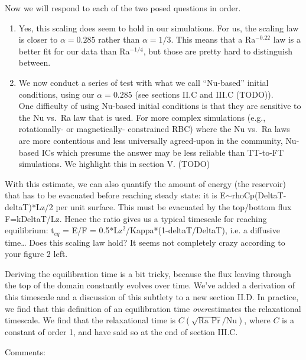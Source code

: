 \documentclass[aps, 11pt, singlecolumn]{revtex4-1} %
\begin{document}
\begin{singlespace}
Now we will respond to each of the two posed questions in order.
\begin{enumerate}
\item 
Yes, this scaling does seem to hold in our simulations.
For us, the scaling law is closer to $\alpha = 0.285$ rather than $\alpha = 1/3$.
This means that a Ra$^{-0.22}$ law is a better fit for our data than Ra$^{-1/4}$, but those are pretty hard to distinguish between.
\item 
We now conduct a series of test with what we call ``Nu-based'' initial conditions, using our $\alpha = 0.285$ (see sections II.C and III.C (TODO)).
\vspace{0.5cm}
\\
One difficulty of using Nu-based initial conditions is that they are sensitive to the Nu vs.~Ra law that is used.
For more complex simulations (e.g., rotationally- or magnetically- constrained RBC) where the Nu vs.~Ra laws are more contentious and less universally agreed-upon in the community, Nu-based ICs which presume the answer may be less reliable than TT-to-FT simulations.
We highlight this in section V. (TODO)
\end{enumerate}


\begin{myquotation}
With this estimate, we can also quantify the amount of energy (the reservoir) that has to be evacuated before reaching steady state: it is E$\sim$rhoCp(DeltaT-deltaT)*Lz/2 per unit surface. 
This must be evacuated by the top/bottom flux F=kDeltaT/Lz. 
Hence the ratio gives us a typical timescale for reaching equilibrium: t$_{eq}$ = E/F = 0.5*Lz$^2$/Kappa*(1-deltaT/DeltaT), i.e. a diffusive time…
Does this scaling law hold? It seems not completely crazy according to your figure 2 left.
\end{myquotation}
Deriving the equilibration time is a bit tricky, because the flux leaving through the top of the domain constantly evolves over time.
We've added a derivation of this timescale and a discussion of this subtlety to a new section II.D.
In practice, we find that this definition of an equilibration time \emph{over}estimates the relaxational timescale.
We find that the relaxational time is $C (\sqrt{\text{Ra Pr}}/\text{Nu})$, where $C$ is a constant of order 1, and have said so at the end of section III.C.

\begin{myquotation}
Comments:


\end{myquotation}
\end{singlespace}
\end{document}
